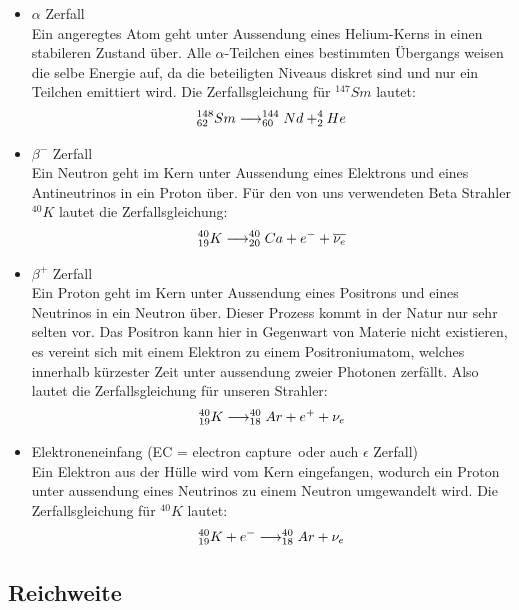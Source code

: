 \documentclass[12pt]{article}
\begin{document}
\begin{itemize}
 \item $\alpha$ Zerfall \\
Ein angeregtes Atom geht unter Aussendung eines Helium-Kerns in einen stabileren Zustand über. Alle $\alpha$-Teilchen eines bestimmten Übergangs weisen die selbe Energie auf, da die beteiligten Niveaus diskret sind und nur ein Teilchen emittiert wird. Die Zerfallsgleichung für $^{147}Sm$ lautet:
\begin{align}
 \notag ^{148}_{62}Sm \longrightarrow ^{144}_{60}Nd + ^4_2He
\end{align}

\item $\beta^-$ Zerfall \\
Ein Neutron geht im Kern unter Aussendung eines Elektrons und eines Antineutrinos in ein Proton über. Für den von uns verwendeten Beta Strahler $^{40}K$ lautet die Zerfallsgleichung:
\begin{align}
 \notag ^{40}_{19}K \longrightarrow ^{40}_{20}Ca + e^- + \overline{\nu_e}
\end{align}

\item $\beta^+$ Zerfall \\
Ein Proton geht im Kern unter Aussendung eines Positrons und eines Neutrinos in ein Neutron über. Dieser Prozess kommt in der Natur nur sehr selten vor. Das Positron kann hier in Gegenwart von Materie nicht existieren, es vereint sich mit einem Elektron zu einem Positroniumatom, welches innerhalb kürzester Zeit unter aussendung zweier Photonen zerfällt. Also lautet die Zerfallsgleichung für unseren Strahler:
\begin{align}
 \notag ^{40}_{19}K \longrightarrow ^{40}_{18}Ar + e^+ + \nu_e
\end{align}

\item Elektroneneinfang (\dq EC = electron capture\dq ~oder auch  \dq$\epsilon$ Zerfall\dq) \\
Ein Elektron aus der Hülle wird vom Kern eingefangen, wodurch ein Proton unter aussendung eines Neutrinos zu einem Neutron umgewandelt wird. Die Zerfallsgleichung für $^{40}K$ lautet:
\begin{align}
 \notag ^{40}_{19}K + e^- \longrightarrow ^{40}_{18}Ar + \nu_e
\end{align}
\end{itemize}

\subsection{Reichweite}
\end{document}
